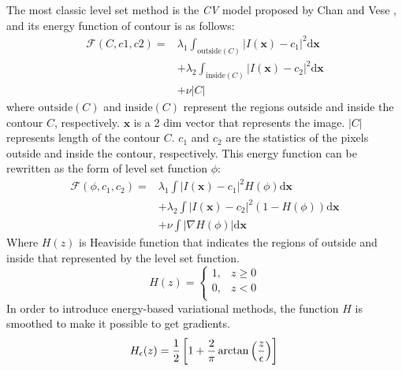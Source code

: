 The most classic level set method is the \emph{CV} model proposed by Chan and Vese \cite{LevelSet:chan2001active}, and its energy function of contour is as follows:
\begin{equation*}\label{eq: Level Set CV contour energy function}
\begin{split}
    \mathcal{F}(C,c1,c2) = & \lambda_1\int_{\text{outside}(C)}\left|I(\mathbf{x})-c_1\right|^2 \mathrm{d}\mathbf{x} \\
     & + \lambda_2\int_{\text{inside}(C)}\left| I(\mathbf{x}) - c_2 \right|^2 \mathrm{d}\mathbf{x} \\
     & + \nu\left| C \right|
\end{split}
\end{equation*}
where $\text{outside}(C)$ and $\text{inside}(C)$ represent the regions outside and inside the contour $C$, respectively. $\mathbf{x}$ is a 2 dim vector that represents the image. $|C|$ represents length of the contour $C$. $c_1$ and $c_2$ are the statistics of the pixels outside and inside the contour, respectively. This energy function can be rewritten as the form of level set function $\phi$:
\begin{equation}\label{eq: Level Set CV phi energy function}
    \begin{split}
        \mathcal{F}(\phi, c_1, c_2) =
        & \lambda_1 \int \left| I(\mathbf{x}) - c_1 \right|^2 H(\phi) \mathrm{d}\mathbf{x} \\
        & + \lambda_2 \int \left| I(\mathbf{x}) - c_2 \right|^2 (1-H(\phi)) \mathrm{d}\mathbf{x} \\
        & + \nu \int \left| \nabla H(\phi) \right| \mathrm{d}\mathbf{x}
    \end{split}
\end{equation}
Where $H(z)$ is Heaviside function that indicates the regions of outside and inside that represented by the level set function.
\begin{equation*}
    H(z) = \left\{
            \begin{matrix}
             1, & z\geq 0 \\
             0, & z < 0 \\
            \end{matrix}\right.
\end{equation*}
In order to introduce energy-based variational methods, the function $H$ is smoothed to make it possible to get gradients.
\begin{equation}\label{eq: equation epsilon}
  H_\epsilon(z) = \frac{1}{2}\left[ 1+\frac{2}{\pi}\arctan\left(\frac{z}{\epsilon}\right) \right] \\
\end{equation}
